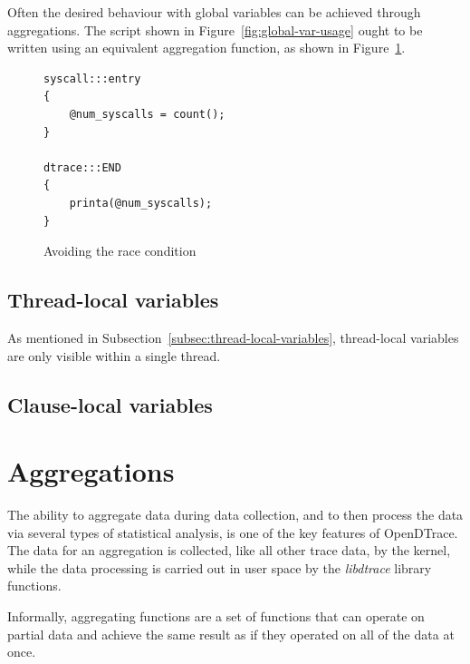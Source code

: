 \noindent
Often the desired behaviour with global variables can be achieved through
aggregations. The script shown in Figure~\ref{fig:global-var-usage} ought to be
written using an equivalent aggregation function, as shown in
Figure~\ref{fig:avoiding-the-race}.

\begin{figure}
  \begin{lstlisting}
syscall:::entry
{
    @num_syscalls = count();
}

dtrace:::END
{
    printa(@num_syscalls);
}
  \end{lstlisting}
  \caption{Avoiding the race condition}
  \label{fig:avoiding-the-race}
\end{figure}

\subsection{Thread-local variables}

As mentioned in Subsection~\ref{subsec:thread-local-variables}, thread-local
variables are only visible within a single thread.

\subsection{Clause-local variables}

\section{Aggregations}
\label{sec:aggregations}

The ability to aggregate data during data collection, and to then
process the data via several types of statistical analysis, is one of
the key features of OpenDTrace.  The data for an aggregation is
collected, like all other trace data, by the kernel, while the data
processing is carried out in user space by the \emph{libdtrace}
library functions.

Informally, aggregating functions are a set of functions that can operate on
partial data and achieve the same result as if they operated on all of the data
at once.

